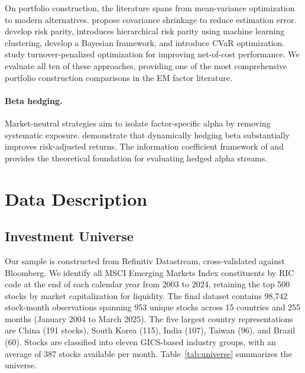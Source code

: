 \documentclass[12pt]{article}
\begin{document}
On portfolio construction, the literature spans from \citet{markowitz1952} mean-variance optimization to modern alternatives. \citet{ledoitwolf2004} propose covariance shrinkage to reduce estimation error. \citet{maillard2010} develop risk parity, \citet{lopezdeprado2016} introduces hierarchical risk parity using machine learning clustering, \citet{blacklitterman1992} develop a Bayesian framework, and \citet{rockafellar2000} introduce CVaR optimization. \citet{olivaresdemiguel2018} study turnover-penalized optimization for improving net-of-cost performance. We evaluate all ten of these approaches, providing one of the most comprehensive portfolio construction comparisons in the EM factor literature.

\paragraph{Beta hedging.} Market-neutral strategies aim to isolate factor-specific alpha by removing systematic exposure. \citet{frazzini2014} demonstrate that dynamically hedging beta substantially improves risk-adjusted returns. The information coefficient framework of \citet{grinold1989} and \citet{grinoldkahn2000} provides the theoretical foundation for evaluating hedged alpha streams.


\section{Data Description}

\subsection{Investment Universe}

Our sample is constructed from Refinitiv Datastream, cross-validated against Bloomberg. We identify all MSCI Emerging Markets Index constituents by RIC code at the end of each calendar year from 2003 to 2024, retaining the top 500 stocks by market capitalization for liquidity. The final dataset contains 98,742 stock-month observations spanning 953 unique stocks across 15 countries and 255 months (January 2004 to March 2025). The five largest country representations are China (191 stocks), South Korea (115), India (107), Taiwan (96), and Brazil (60). Stocks are classified into eleven GICS-based industry groups, with an average of 387 stocks available per month. Table~\ref{tab:universe} summarizes the universe.
\end{document}
